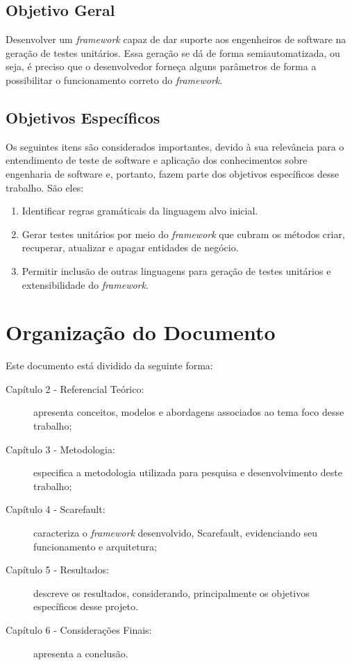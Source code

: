\subsection{Objetivo Geral}
Desenvolver um \textit{framework} capaz de dar suporte aos engenheiros de
software na geração de testes unitários.  Essa geração se dá de forma
semiautomatizada, ou seja, é preciso que o desenvolvedor forneça alguns
parâmetros de forma a possibilitar o funcionamento correto do
\textit{framework}.

\subsection{Objetivos Específicos} \label{objspec}
Os seguintes itens são considerados importantes, devido à sua relevância para o
entendimento de teste de software e aplicação dos conhecimentos sobre
engenharia de software e, portanto, fazem parte dos objetivos específicos desse
trabalho. São eles:
\begin{enumerate}
\item Identificar regras gramáticais da linguagem alvo inicial.
\item Gerar testes unitários por meio do \textit{framework} que cubram
os métodos criar, recuperar, atualizar e apagar entidades de negócio.
\item Permitir inclusão de outras linguagens para geração de testes
unitários e extensibilidade do \textit{framework}.
\end{enumerate}

\section{Organização do Documento}
  Este documento está dividido da seguinte forma:

\begin{description}
  \item[Capítulo 2 - Referencial Teórico:] apresenta conceitos, modelos e
    abordagens associados ao tema foco desse trabalho;

  \item[Capítulo 3 - Metodologia:] especifica a metodologia utilizada para
    pesquisa e desenvolvimento deste trabalho;

  \item[Capítulo 4 - Scarefault:] caracteriza o \textit{framework} desenvolvido, Scarefault, evidenciando seu funcionamento e arquitetura;

  \item[Capítulo 5 - Resultados:] descreve os resultados, considerando, principalmente os objetivos específicos desse projeto.
  
  \item[Capítulo 6 - Considerações Finais:] apresenta a conclusão.
\end{description}
